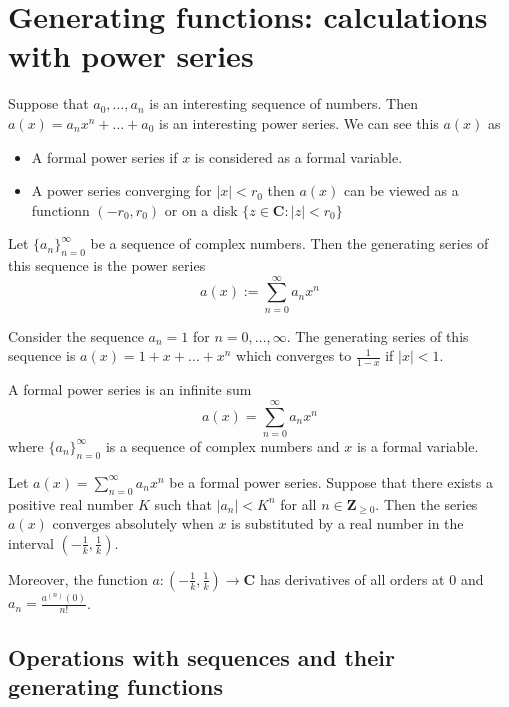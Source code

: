 \section{Generating functions: calculations with power series}

Suppose that $a_{0},\dots,a_{n}$ is an interesting sequence of numbers. Then $a(x)=a_{n}x^{n}+\dots +a_{0}$ is an interesting power series. We can see this $a(x)$ as 
\begin{itemize}
\item A formal power series if $x$ is considered as a formal variable.
\item A power series converging for $|x|<r_{0}$ then $a(x)$ can be viewed as a functionn $(-r_{0},r_{0})$ or on a disk $\{ z\in \mathbf{C}:|z|<r_{0} \}$
\end{itemize}

\begin{definition}
Let $\{ a_{n} \}_{n=0}^{\infty}$ be a sequence of complex numbers. Then the generating series of this sequence is the power series
$$
a(x):= \sum_{n=0}^{\infty} a_{n}x^{n}
$$
\end{definition}
\begin{example}
Consider the sequence $a_{n}=1$ for $n=0,\dots,\infty$. The generating series of this sequence is $a(x)=1+x+\dots +x^{n}$ which converges to $\frac{1}{1-x}$ if $|x|<1$.
\end{example}

\begin{definition}
A formal power series is an infinite sum 
$$
a(x)=\sum_{n=0}^{\infty} a_{n}x^{n}
$$
where $\{ a_{n} \}_{n=0}^{\infty}$ is a sequence of complex numbers and $x$ is a formal variable.
\end{definition}
\begin{proposition}
Let $a(x)=\sum_{n=0}^{\infty}a_{n}x^{n}$ be a formal power series. Suppose that there exists a positive real number $K$ such that $|a_{n}|<K^{n}$ for all $n\in \mathbf{Z}_{\ge 0}$. Then the series $a(x)$ converges absolutely when $x$ is substituted by a real number in the interval $\left( -\frac{1}{k}, \frac{1}{k} \right)$.

Moreover, the function $a:\left( -\frac{1}{k}, \frac{1}{k} \right)\to \mathbf{C}$ has derivatives of all orders at 0 and $a_{n}=\frac{a^{(n)}(0)}{n!}$.
\end{proposition}

\subsection*{Operations with sequences and their generating functions}

